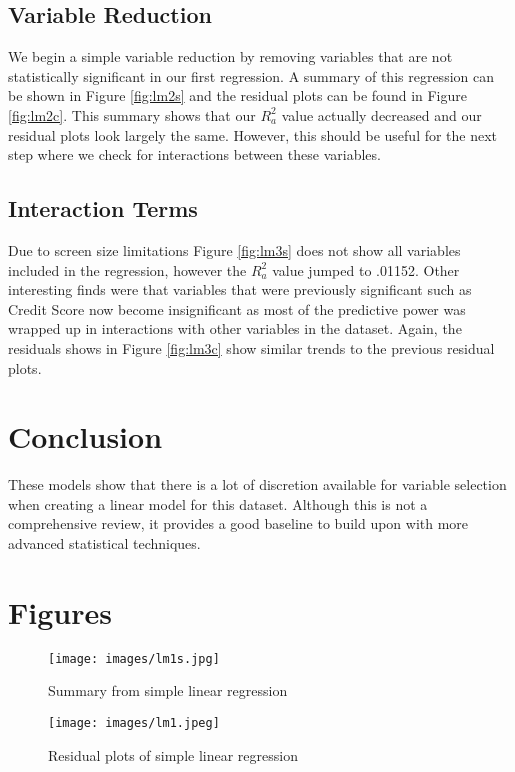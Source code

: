 \documentclass[10pt,twocolumn,letterpaper]{article}
\begin{document}
\subsection{Variable Reduction}

We begin a simple variable reduction by removing variables that are not statistically significant in our first regression. A summary of this regression can be shown in Figure \ref{fig:lm2s} and the residual plots can be found in Figure \ref{fig:lm2c}. This summary shows that our $R^2_a$ value actually decreased and our residual plots look largely the same. However, this should be useful for the next step where we check for interactions between these variables.

\subsection{Interaction Terms}
Due to screen size limitations Figure \ref{fig:lm3s} does not show all variables included in the regression, however the $R^2_a$ value jumped to .01152. Other interesting finds were that variables that were previously significant such as Credit Score now become insignificant as most of the predictive power was wrapped up in interactions with other variables in the dataset. Again, the residuals shows in Figure \ref{fig:lm3c} show similar trends to the previous residual plots.

\section{Conclusion}
These models show that there is a lot of discretion available for variable selection when creating a linear model for this dataset. Although this is not a comprehensive review, it provides a good baseline to build upon with more advanced statistical techniques.


\section{Figures}

\begin{figure}
	\texttt{[image: images/lm1s.jpg]}
	\caption{Summary from simple linear regression}
	\label{fig:lm1s}
\end{figure}

\begin{figure}
	\texttt{[image: images/lm1.jpeg]}
	\caption{Residual plots of simple linear regression}
	\label{fig:lm1c}
\end{figure}
\end{document}
